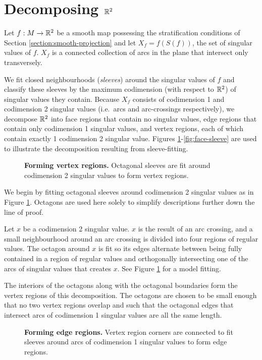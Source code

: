 \section{Decomposing $\mathbb{R}^2$}

Let $f:M\to\mathbb{R}^2$ be a smooth map possessing the stratification conditions of Section \ref{section:smooth-projection} and let $X_f = f(S(f))$, the set of singular values of $f$.
$X_f$ is a connected collection of arcs in the plane that intersect only transversely.

We fit closed neighbourhoods (\emph{sleeves}) around the singular values of $f$ and classify these sleeves by the maximum codimension (with respect to $\mathbb{R}^2$) of singular values they contain.
Because $X_f$ consists of codimension 1 and codimension 2 singular values (i.e.\ arcs and arc-crossings respectively), we decompose $\mathbb{R}^2$ into face regions that contain no singular values, edge regions that contain only codimension 1 singular values, and vertex regions, each of which contain exactly 1 codimension 2 singular value.
Figures \ref{fig:vertex-sleeve}-\ref{fig:face-sleeve} are used to illustrate the decomposition resulting from sleeve-fitting.

\begin{figure}[h!]
	\label{fig:vertex-sleeve}
	\caption{
		\textbf{Forming vertex regions.}
		Octagonal sleeves are fit around codimension 2 singular values to form vertex regions.
	}
\end{figure}

We begin by fitting octagonal sleeves around codimension 2 singular values as in Figure \ref{fig:vertex-sleeve}.
Octagons are used here solely to simplify descriptions further down the line of proof.

Let $x$ be a codimension 2 singular value.
$x$ is the result of an arc crossing, and a small neighbourhood around an arc crossing is divided into four regions of regular values.
The octagon around $x$ is fit so its edges alternate between being fully contained in a region of regular values and orthogonally intersecting one of the arcs of singular values that creates $x$.
See Figure \ref{fig:vertex-sleeve} for a model fitting.

The interiors of the octagons along with the octagonal boundaries form the vertex regions of this decomposition.
The octagons are chosen to be small enough that no two vertex regions overlap and such that the octagonal edges that intersect arcs of codimension 1 singular values are all the same length.

\begin{figure}[h!]
	\label{fig:edge-sleeve}
	\caption{
		\textbf{Forming edge regions.}
		Vertex region corners are connected to fit sleeves around arcs of codimension 1 singular values to form edge regions.
	}
\end{figure}

